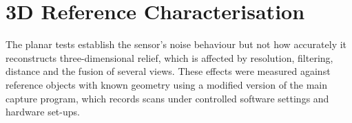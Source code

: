 \section{3D Reference Characterisation}
\label{sec5.2:reference}
The planar tests establish the sensor's noise behaviour but not how accurately it reconstructs three-dimensional relief, which is affected by resolution, filtering, distance and the fusion of several views. These effects were measured against reference objects with known geometry using a modified version of the main capture program, which records scans under controlled software settings and hardware set-ups.



%
%
%
